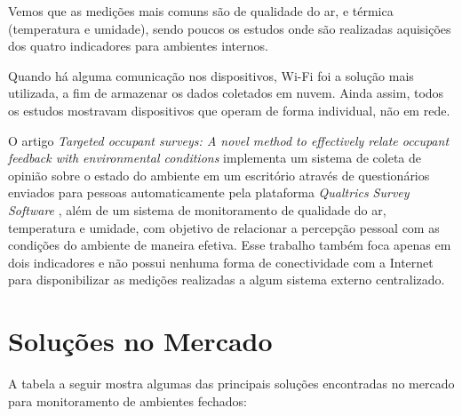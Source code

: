\documentclass[../monografia.tex]{subfiles}
\begin{document}
Vemos que as medições mais comuns são de qualidade do ar, e térmica (temperatura e umidade), sendo poucos os estudos onde são realizadas aquisições dos quatro indicadores para ambientes internos. 

Quando há alguma comunicação nos dispositivos, Wi-Fi foi a solução mais utilizada, a fim de armazenar os dados coletados em nuvem. Ainda assim, todos os estudos mostravam dispositivos que operam de forma individual, não em rede. 

O artigo \textit{Targeted occupant surveys: A novel method to effectively relate occupant feedback with environmental conditions} \cite{trabalho-feedback} implementa um sistema de coleta de opinião sobre o estado do ambiente em um escritório através de questionários enviados para pessoas automaticamente pela plataforma \textit{Qualtrics Survey Software} \cite{qualitrics}, além de um sistema de monitoramento de qualidade do ar, temperatura e umidade, com objetivo de relacionar a percepção pessoal com as condições do ambiente de maneira efetiva. Esse trabalho também foca apenas em dois indicadores e não possui nenhuma forma de conectividade com a Internet para disponibilizar as medições realizadas a algum sistema externo centralizado. 


\section{Soluções no Mercado} 

A tabela a seguir mostra algumas das principais soluções encontradas no mercado para monitoramento de ambientes fechados: 
\end{document}
